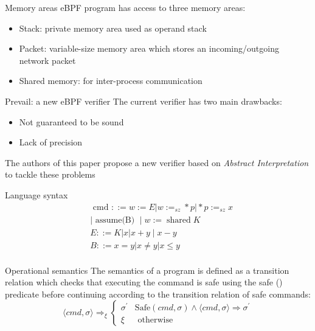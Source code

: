 \documentclass[aspectratio=169]{beamer}
\begin{document}
\begin{frame}{Memory areas}
  eBPF program has access to three memory areas:
  \begin{itemize}
    \item Stack: private memory area used as operand stack
    \item Packet: variable-size memory area which stores an incoming/outgoing network packet
    \item Shared memory: for inter-process communication
  \end{itemize}
\end{frame}

\begin{frame}{Prevail: a new eBPF verifier}
  The current verifier has two main drawbacks:
  \begin{itemize}
    \item Not guaranteed to be sound
    \item Lack of precision
  \end{itemize}
  The authors of this paper propose a new verifier based on \textit{Abstract Interpretation} to tackle these
  problems
\end{frame}

\begin{frame}{Language syntax}
  $$
    \begin{aligned}
       & \text { cmd }::=w:=E\left|w:=_{s z} * p\right| * p:=_{s z} x \\
       & \mid \text { assume(B) } \mid w:=\operatorname{shared} K     \\
       & E::=K|x| x+y \mid x-y                                        \\
       & B ::=x=y|x \neq y| x \leq y                                  \\
       &
    \end{aligned}
  $$
\end{frame}

\begin{frame}{Operational semantics}
  The semantics of a program is defined as a transition relation which checks that executing the command is safe using the safe () predicate before continuing according to the transition relation of safe commands:
  $$
    \langle c m d, \sigma\rangle \Rightarrow_{\xi} \begin{cases}\sigma^{\prime} & \mathrm{Safe}(c m d, \sigma) \wedge\langle c m d, \sigma\rangle \Rightarrow \sigma^{\prime} \\ \xi & \text { otherwise }\end{cases}
  $$
\end{frame}
\end{document}

